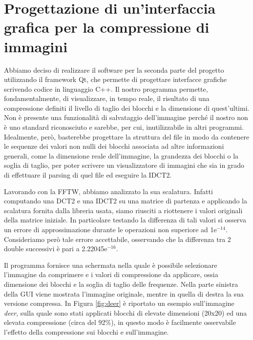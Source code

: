 \part{Progettazione di un'interfaccia grafica per la compressione di immagini}

Abbiamo deciso di realizzare il software per la seconda parte del progetto utilizzando il framework Qt\cite{qt}, che permette di progettare interfacce grafiche scrivendo codice in linguaggio C++. Il nostro programma permette, fondamentalmente, di visualizzare, in tempo reale, il risultato di una compressione definiti il livello di taglio dei blocchi e la dimensione di quest'ultimi. Non è presente una funzionalità di salvataggio dell'immagine perché il nostro non è uno standard riconosciuto e sarebbe, per cui, inutilizzabile in altri programmi.
Idealmente, però, basterebbe progettare la struttura del file in modo da contenere le sequenze dei valori non nulli dei blocchi associata ad altre informazioni generali, come la dimensione reale dell'immagine, la grandezza dei blocchi o la soglia di taglio, per poter scrivere un visualizzatore di immagini che sia in grado di effettuare il parsing di quel file ed eseguire la IDCT2.

Lavorando con la FFTW, abbiamo analizzato la sua scalatura. Infatti computando una DCT2 e una IDCT2 su una matrice di partenza e applicando la scalatura fornita dalla libreria usata, siamo riusciti a riottenere i valori originali della matrice iniziale. In particolare testando la differenza di tali valori si osserva un errore di approssimazione durante le operazioni non superiore ad 1e$^{-14}$. Consideriamo però tale errore accettabile, osservando che la differenza tra 2 double successivi è pari a 2.22045e$^{-16}$.

Il programma fornisce una schermata nella quale è possibile selezionare l'immagine da comprimere e i valori di compressione da applicare, ossia dimensione dei blocchi e la soglia di taglio delle frequenze. Nella parte sinistra della GUI viene mostrata l'immagine originale, mentre in quella di destra la sua versione compressa. In Figura \ref{fig:deer} è riportato un esempio sull'immagine \textit{deer}, sulla quale sono stati applicati blocchi di elevate dimensioni (20x20) ed una elevata compressione (circa del 92\%), in questo modo è facilmente osservabile l'effetto della compressione sui blocchi e sull'immagine.

